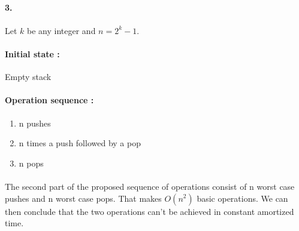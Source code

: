 \paragraph{3.} 
\paragraph{}
Let $k$ be any integer and $n=2^k-1$. 

\paragraph{Initial state : } Empty stack
\paragraph{Operation sequence : }
\begin{enumerate}
\item{}n pushes
\item{}n times a push followed by a pop
\item{}n pops
\end{enumerate}

\paragraph{}
The second part of the proposed sequence of operations consist of n worst case pushes and n worst case pops. That makes $O(n^2)$ basic operations. We can then conclude that the two operations can't be achieved in constant amortized time.



